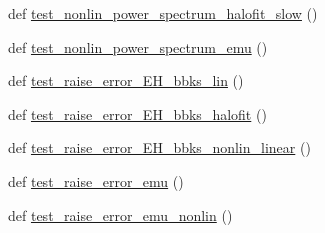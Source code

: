 \begin{DoxyCompactItemize}
\item 
def \mbox{\hyperlink{namespaceccl__test__power_a050922793db7934bbd53d31e87dd1ff1}{test\+\_\+nonlin\+\_\+power\+\_\+spectrum\+\_\+halofit\+\_\+slow}} ()
\item 
def \mbox{\hyperlink{namespaceccl__test__power_a4d6ab9bc4f6987e0c4cae1e6ad4f7134}{test\+\_\+nonlin\+\_\+power\+\_\+spectrum\+\_\+emu}} ()
\item 
def \mbox{\hyperlink{namespaceccl__test__power_a870b9e0aaacdf9414f50076dd8f7e6aa}{test\+\_\+raise\+\_\+error\+\_\+\+E\+H\+\_\+bbks\+\_\+lin}} ()
\item 
def \mbox{\hyperlink{namespaceccl__test__power_a78e189d0d7c824f3f9be09450e8b7fc6}{test\+\_\+raise\+\_\+error\+\_\+\+E\+H\+\_\+bbks\+\_\+halofit}} ()
\item 
def \mbox{\hyperlink{namespaceccl__test__power_a0cc7b191eb27884dd4cc1de807358909}{test\+\_\+raise\+\_\+error\+\_\+\+E\+H\+\_\+bbks\+\_\+nonlin\+\_\+linear}} ()
\item 
def \mbox{\hyperlink{namespaceccl__test__power_aec6c96676e6bad8448cc1fcab8dcf703}{test\+\_\+raise\+\_\+error\+\_\+emu}} ()
\item 
def \mbox{\hyperlink{namespaceccl__test__power_ae5cff37be020cc048e6e4c6e98d1235f}{test\+\_\+raise\+\_\+error\+\_\+emu\+\_\+nonlin}} ()
\end{DoxyCompactItemize}
